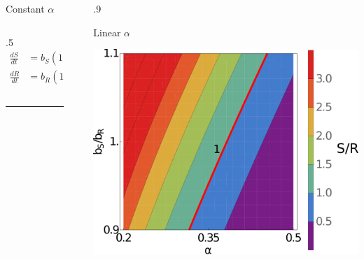 \documentclass[final]{beamer}
\newlength{\sepwid}
\newlength{\onecolwid}
\newlength{\figwid}
\begin{document}
\begin{frame}[t]
\begin{block}
\begin{columns}[t]
\begin{column}{\onecolwid}
\begin{block}{Constant $\alpha$}
\begin{columns}[t]
\begin{column}{.5\onecolwid}
      \begin{align*}
        \frac{dS}{dt}& = b_S \left(1 - \frac{S + R}{K}\right)S - \alpha S \\[0.5ex]
        \frac{dR}{dt}& = b_R \left(1 - \frac{S + R}{K}\right)R + \alpha S - \delta R
      \end{align*}

      \vspace{2.9\baselineskip}
      \vspace{1ex}
    \end{column}
  \end{columns}
  \hrule height 3pt
  \end{block}
\end{column}

\vrule width 5pt
\begin{column}{\sepwid}\end{column} %

\begin{column}{.9\onecolwid}

  \begin{block}{Linear $\alpha$}
    \begin{center}
      \includegraphics[width=\figwid]{../dev/graphics/poster/linear_contour.pdf}
      \vspace{1.5ex}


\end{center}
\end{block}
\end{column}
\end{columns}
\end{block}
\end{frame}
\end{document}
